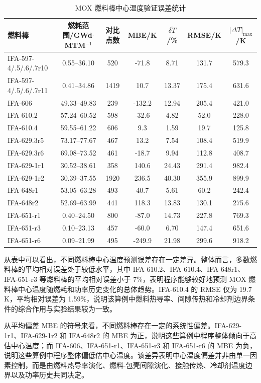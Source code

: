\begin{table}[htbp]
	\centering
	\caption{MOX 燃料棒中心温度验证误差统计}
	\label{tab:centerline_temperature_error}
	\begin{tabular}{lcccccc}
		\toprule
		燃料棒 & 燃耗范围/GWd$\cdot$MTM$^{-1}$ & 对比点数 & MBE/K & $\overline{\delta T}$/\% & RMSE/K & $|\Delta T|_{\max}$/K\\
		\midrule
		IFA-597-4/.5/.6/.7r10 & 0.55--36.10 & 520 & -71.8 & 8.71 & 131.7 & 579.3 \\
		IFA-597-4/.5/.6/.7r11 & 0.41--34.86 & 1419 & 10.7 & 13.37 & 175.4 & 631.6 \\
		IFA-606 & 49.33--49.83 & 239 & -132.2 & 12.94 & 205.4 & 421.0 \\
		IFA-610.2 & 57.24--60.52 & 598 & -32.6 & 4.82 & 52.0 & 228.0 \\
		IFA-610.4 & 59.55--61.22 & 606 & 9.3 & 1.59 & 19.7 & 125.8 \\
		IFA-629.3r5 & 73.17--77.67 & 467 & 13.2 & 7.54 & 108.4 & 519.9 \\
		IFA-629.3r6 & 69.08--73.52 & 461 & -18.7 & 9.94 & 112.8 & 408.7 \\
		IFA-629-1r1 & 30.52--38.61 & 358 & 140.6 & 24.43 & 291.4 & 982.4 \\
		IFA-629-1r2 & 30.39--37.55 & 1920 & 236.5 & 40.30 & 355.9 & 899.9 \\
		IFA-648r1 & 53.05--63.28 & 493 & 40.7 & 5.61 & 60.2 & 242.4 \\
		IFA-648r2 & 52.69--63.99 & 441 & 118.3 & 13.83 & 130.1 & 275.6 \\
		IFA-651-r1 & 0.40--24.50 & 800 & -87.0 & 14.73 & 227.8 & 769.3 \\
		IFA-651-r3 & 0.10--23.13 & 457 & -60.0 & 6.70 & 147.4 & 651.6 \\
		IFA-651-r6 & 0.09--21.99 & 495 & -249.9 & 21.98 & 299.6 & 918.2 \\
		\bottomrule
	\end{tabular}
\end{table}

从表中可以看出，不同燃料棒中心温度预测误差存在一定差异。整体而言，多数燃料棒的平均相对误差处于较低水平，其中 IFA-610.2、IFA-610.4、IFA-648r1、IFA-651-r3 等燃料棒的平均相对误差小于 7\%，表明程序能够较好地预测 MOX 燃料棒中心温度随燃耗和功率历史变化的总体趋势。IFA-610.4 的 RMSE 仅为 19.7 K，平均相对误差为 1.59\%，说明该算例中燃料热导率、间隙传热和冷却剂边界条件的综合作用与实验结果较为一致。

从平均偏差 MBE 的符号来看，不同燃料棒存在一定的系统性偏差。IFA-629-1r1、IFA-629-1r2 和 IFA-648r2 的 MBE 为正，说明这些算例中程序整体倾向于高估中心温度；而 IFA-606、IFA-651-r1、IFA-651-r3 和 IFA-651-r6 的 MBE 为负，说明这些算例中程序整体偏低估中心温度。该差异表明中心温度偏差并非由单一因素控制，而是由燃料热导率演化、燃料-包壳间隙演化、接触传热、冷却剂温度边界以及功率历史共同决定。

